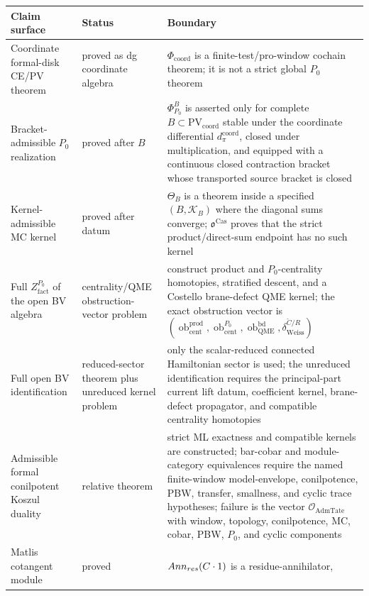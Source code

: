 \begin{longtable}{@{}>{\raggedright\arraybackslash}p{}
  >{\raggedright\arraybackslash}p{}
  >{\raggedright\arraybackslash}p{}@{}}
\textbf{Claim surface} & \textbf{Status} & \textbf{Boundary}\\
\hline
Coordinate formal-disk CE/PV theorem & proved as dg coordinate
algebra &
\(\Phi_{\mathrm{coord}}\) is a finite-test/pro-window cochain theorem;
it is not a strict global \(P_0\) theorem\\
Bracket-admissible \(P_0\) realization & proved after \(B\) &
\(\Phi^B_{P_0}\) is asserted only for complete \(B\subset
\mathrm{PV}_{\mathrm{coord}}\) stable under the coordinate differential
\(d_\pi^{\mathrm{coord}}\), closed under
multiplication, and equipped with a continuous closed contraction bracket
whose transported source bracket is closed\\
Kernel-admissible MC kernel & proved after datum &
\(\Theta_B\) is a theorem inside a specified \((B,\mathcal K_B)\) where
the diagonal sums converge; \(\mathfrak o^{\mathrm{Cas}}\) proves that
the strict product/direct-sum endpoint has no such kernel\\
Full \(Z^{P_0}_{\mathrm{fact}}\) of the open BV algebra &
centrality/QME obstruction-vector problem &
construct product and \(P_0\)-centrality homotopies, stratified descent,
and a Costello brane-defect QME kernel; the exact obstruction vector is
\((\operatorname{ob}^{\mathrm{prod}}_{\mathrm{cent}},
\operatorname{ob}^{P_0}_{\mathrm{cent}},
\operatorname{ob}^{\mathrm{bd}}_{\mathrm{QME}},
\delta_{\mathrm{Weiss}}^{\check C/R})\)\\
Full open BV identification & reduced-sector theorem plus unreduced
kernel problem &
only the scalar-reduced connected Hamiltonian sector is used; the
unreduced identification requires the principal-part current lift datum,
coefficient kernel, brane-defect propagator, and compatible centrality
homotopies\\
Admissible formal conilpotent Koszul duality & relative theorem &
strict ML exactness and compatible kernels are constructed; bar-cobar
and module-category equivalences require the named finite-window
model-envelope, conilpotence, PBW, transfer, smallness, and cyclic trace
hypotheses; failure is the vector
\(\mathcal O_{\mathrm{AdmTate}}\) with window, topology, conilpotence,
MC, cobar, PBW, \(P_0\), and cyclic components\\
Matlis cotangent module & proved &
\(Ann_{res}(C\cdot1)\) is a residue-annihilator,

\end{longtable}
